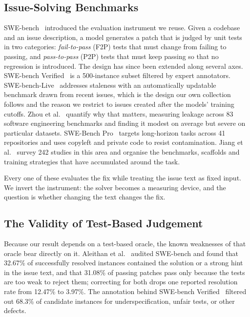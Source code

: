 \documentclass[journal]{IEEEtran}
\begin{document}
\subsection{Issue-Solving Benchmarks}

SWE-bench~\cite{jimenez2024swebench} introduced the evaluation instrument we reuse. Given a
codebase and an issue description, a model generates a patch that is judged by unit tests in
two categories: \emph{fail-to-pass} (F2P) tests that must change from failing to passing, and
\emph{pass-to-pass} (P2P) tests that must keep passing so that no regression is introduced.
The design has since been extended along several axes. SWE-bench
Verified~\cite{openai2024verified} is a 500-instance subset filtered by expert annotators.
SWE-bench-Live~\cite{zhang2025swebenchlive} addresses staleness with an automatically
updatable benchmark drawn from recent issues, which is the design our own collection follows
and the reason we restrict to issues created after the models' training cutoffs. Zhou et
al.~\cite{zhou2025lessleak} quantify why that matters, measuring leakage across 83 software
engineering benchmarks and finding it modest on average but severe on particular datasets.
SWE-Bench Pro~\cite{deng2025swebenchpro} targets long-horizon tasks across 41 repositories and
uses copyleft and private code to resist contamination. Jiang et al.~\cite{jiang2025survey}
survey 242 studies in this area and organise the benchmarks, scaffolds and training strategies
that have accumulated around the task.

Every one of these evaluates the fix while treating the issue text as fixed input. We invert
the instrument: the solver becomes a measuring device, and the question is whether changing
the text changes the fix.

\subsection{The Validity of Test-Based Judgement}

Because our result depends on a test-based oracle, the known weaknesses of that oracle bear
directly on it. Aleithan et al.~\cite{aleithan2024swebenchplus} audited SWE-bench and found
that 32.67\% of successfully resolved instances contained the solution or a strong hint in the
issue text, and that 31.08\% of passing patches pass only because the tests are too weak to
reject them; correcting for both drops one reported resolution rate from 12.47\% to 3.97\%.
The annotation behind SWE-bench Verified~\cite{openai2024verified} filtered out 68.3\% of
candidate instances for underspecification, unfair tests, or other defects.
\end{document}
